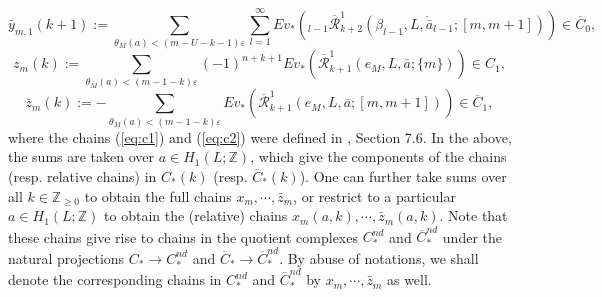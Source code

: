 \documentclass[a4paper]{article}
\numberwithin{equation}{section}
\begin{document}
\begin{equation}\label{eq:c8}
\bar{y}_{m,1}(k+1):=\sum_{\theta_M(a)<(m-U-k-1)\varepsilon}\sum_{l=1}^\infty\mathit{Ev}_\ast\left({}_{l-1}\overline{\mathcal{R}}_{k+2}^1(\beta_{l-1},L,\ring{\bar{a}}_{l-1};[m,m+1])\right)\in\overline{C}_0,
\end{equation}
\begin{equation}\label{eq:c9}
z_{m}(k):=\sum_{\theta_M(a)<(m-1-k)\varepsilon}(-1)^{n+k+1}\mathit{Ev}_\ast\left(\overline{\mathcal{R}}_{k+1}^1(e_M,L,\bar{a};\{m\})\right)\in C_1,
\end{equation}
\begin{equation}\label{eq:c10}
\bar{z}_{m}(k):=-\sum_{\theta_M(a)<(m-1-k)\varepsilon}\mathit{Ev}_\ast\left(\overline{\mathcal{R}}_{k+1}^1(e_M,L,\bar{a};[m,m+1])\right)\in\overline{C}_1,
\end{equation}
where the chains (\ref{eq:c1}) and (\ref{eq:c2}) were defined in \cite{ki2}, Section 7.6. In the above, the sums are taken over $a\in H_1(L;\mathbb{Z})$, which give the components of the chains (resp. relative chains) in $C_\ast(k)$ (resp. $\overline{C}_\ast(k)$). One can further take sums over all $k\in\mathbb{Z}_{\geq0}$ to obtain the full chains $x_m,\cdots,\bar{z}_m$, or restrict to a particular $a\in H_1(L;\mathbb{Z})$ to obtain the (relative) chains $x_m(a,k),\cdots,\bar{z}_m(a,k)$. Note that these chains give rise to chains in the quotient complexes $C_\ast^\mathit{nd}$ and $\overline{C}_\ast^\mathit{nd}$ under the natural projections $C_\ast\rightarrow C_\ast^\mathit{nd}$ and $\overline{C}_\ast\rightarrow\overline{C}_\ast^\mathit{nd}$. By abuse of notations, we shall denote the corresponding chains in $C_\ast^\mathit{nd}$ and $\overline{C}_\ast^\mathit{nd}$ by $x_m,\cdots,\bar{z}_m$ as well. 
\end{document}
